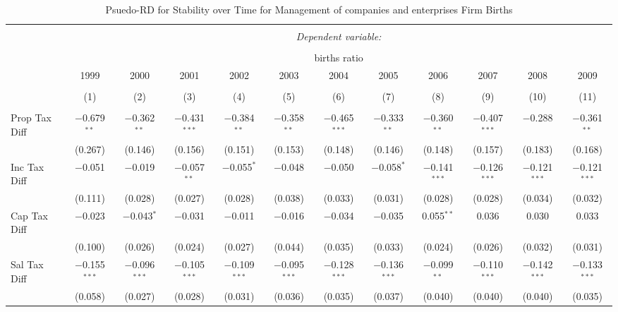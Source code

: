 
\begin{table}[!htbp] \centering 
  \caption{Psuedo-RD for Stability over Time for  Management of companies and enterprises Firm Births} 
  \label{55year} 
\small 
\begin{tabular}{@{\extracolsep{5pt}}lccccccccccc} 
\\[-1.8ex]\hline 
\hline \\[-1.8ex] 
 & \multicolumn{11}{c}{\textit{Dependent variable:}} \\ 
\cline{2-12} 
\\[-1.8ex] & \multicolumn{11}{c}{births ratio} \\ 
 & 1999 & 2000 & 2001 & 2002 & 2003 & 2004 & 2005 & 2006 & 2007 & 2008 & 2009 \\ 
\\[-1.8ex] & (1) & (2) & (3) & (4) & (5) & (6) & (7) & (8) & (9) & (10) & (11)\\ 
\hline \\[-1.8ex] 
 Prop Tax Diff & $-$0.679$^{**}$ & $-$0.362$^{**}$ & $-$0.431$^{***}$ & $-$0.384$^{**}$ & $-$0.358$^{**}$ & $-$0.465$^{***}$ & $-$0.333$^{**}$ & $-$0.360$^{**}$ & $-$0.407$^{***}$ & $-$0.288 & $-$0.361$^{**}$ \\ 
  & (0.267) & (0.146) & (0.156) & (0.151) & (0.153) & (0.148) & (0.146) & (0.148) & (0.157) & (0.183) & (0.168) \\ 
  Inc Tax Diff & $-$0.051 & $-$0.019 & $-$0.057$^{**}$ & $-$0.055$^{*}$ & $-$0.048 & $-$0.050 & $-$0.058$^{*}$ & $-$0.141$^{***}$ & $-$0.126$^{***}$ & $-$0.121$^{***}$ & $-$0.121$^{***}$ \\ 
  & (0.111) & (0.028) & (0.027) & (0.028) & (0.038) & (0.033) & (0.031) & (0.028) & (0.028) & (0.034) & (0.032) \\ 
  Cap Tax Diff & $-$0.023 & $-$0.043$^{*}$ & $-$0.031 & $-$0.011 & $-$0.016 & $-$0.034 & $-$0.035 & 0.055$^{**}$ & 0.036 & 0.030 & 0.033 \\ 
  & (0.100) & (0.026) & (0.024) & (0.027) & (0.044) & (0.035) & (0.033) & (0.024) & (0.026) & (0.032) & (0.031) \\ 
  Sal Tax Diff & $-$0.155$^{***}$ & $-$0.096$^{***}$ & $-$0.105$^{***}$ & $-$0.109$^{***}$ & $-$0.095$^{***}$ & $-$0.128$^{***}$ & $-$0.136$^{***}$ & $-$0.099$^{**}$ & $-$0.110$^{***}$ & $-$0.142$^{***}$ & $-$0.133$^{***}$ \\ 
  & (0.058) & (0.027) & (0.028) & (0.031) & (0.036) & (0.035) & (0.037) & (0.040) & (0.040) & (0.040) & (0.035) \\ 

\end{tabular}
\end{table}
